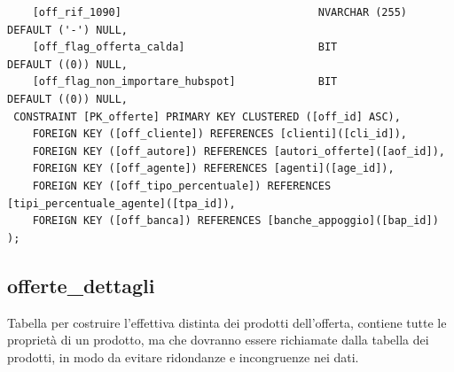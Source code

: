 \documentclass[12pt]{article}
\begin{document}
\begin{lstlisting}
    [off_rif_1090]                               NVARCHAR (255)  DEFAULT ('-') NULL,
    [off_flag_offerta_calda]                     BIT             DEFAULT ((0)) NULL,
    [off_flag_non_importare_hubspot]             BIT             DEFAULT ((0)) NULL,
 CONSTRAINT [PK_offerte] PRIMARY KEY CLUSTERED ([off_id] ASC),
    FOREIGN KEY ([off_cliente]) REFERENCES [clienti]([cli_id]),
    FOREIGN KEY ([off_autore]) REFERENCES [autori_offerte]([aof_id]),
    FOREIGN KEY ([off_agente]) REFERENCES [agenti]([age_id]),
    FOREIGN KEY ([off_tipo_percentuale]) REFERENCES [tipi_percentuale_agente]([tpa_id]),
    FOREIGN KEY ([off_banca]) REFERENCES [banche_appoggio]([bap_id])
);
\end{lstlisting}

\subsection{offerte\_dettagli}
Tabella per costruire l'effettiva distinta dei prodotti dell'offerta, contiene tutte le proprietà di un prodotto,
ma che dovranno essere richiamate dalla tabella dei prodotti,
in modo da evitare ridondanze e incongruenze nei dati.
\end{document}
